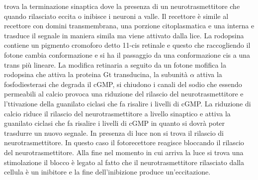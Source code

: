 trova la terminazione sinaptica dove la presenza di un neurotrasmettitore che quando rilasciato eccita o inibisce i neuroni a valle. Il recettore \`e simile al recettore con domini 
transmembrana, una porzione citoplasmatica e una interna e trasduce il segnale in maniera simila ma viene attivato dalla lice. La rodopsina contiene un pigmento cromoforo detto 11-cis
retinale e questo che raccogliendo il fotone cambia conformazione e si ha il passaggio da una conformazione cis a una trans pi\`u lineare. La modifica retinaria a seguito da un fotone
mofifica la rodopsina che attiva la proteina Gt transducina, la subunit\`a $\alpha$ attiva la fosfodiesterasi che degrada il cGMP, si chiudono i canali del sodio che essendo permeabili
al calcio provoca una riduzione del rilascio del neurotrasmettitore e l'ttivazione della guanilato ciclasi che fa risalire i livelli di cGMP. La riduzione di calcio riduce il rilascio
del neurotrasmettitore a livello sinaptico e attiva la guanilato ciclasi che fa risalire i livelli di cGMP in quanto si dovr\`a poter trasdurre un nuovo segnale. In presenza di luce non
si trova il rilascio di neurotrasmettitore. In questo caso il fotorecettore reagisce bloccando il rilascio del neurotrasmettitore. Alla fine nel momento in cui arriva la luce si trova
una stimolazione il blocco \`e legato al fatto che il neurotrasmettitore rilasciato dalla cellula \`e un inibitore e la fine dell'inibizione produce un'eccitazione. 

